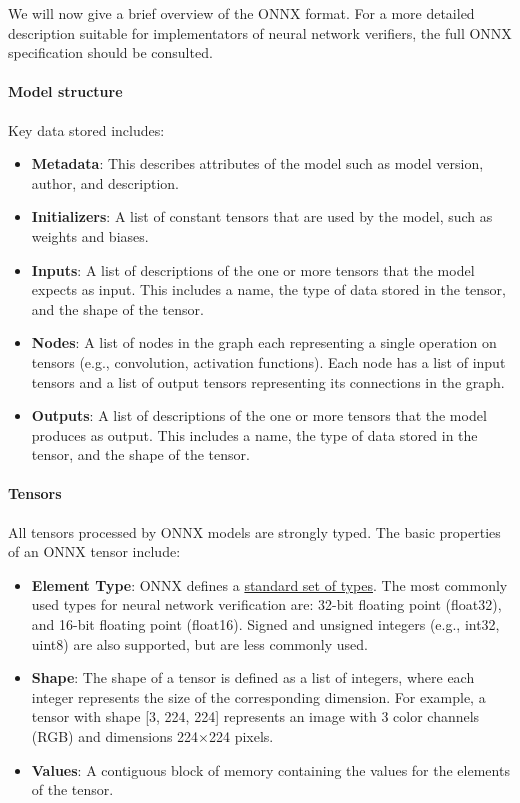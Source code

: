 We will now give a brief overview of the ONNX format. For a more detailed description suitable for implementators of neural network verifiers, the full ONNX specification should be consulted. 

\paragraph{Model structure} 

Key data stored includes:
\begin{itemize}
	\item \textbf{Metadata}: This describes attributes of the model such as model version, author, and description.
	\item \textbf{Initializers}: A list of constant tensors that are used by the model, such as weights and biases.
	\item \textbf{Inputs}: A list of descriptions of the one or more tensors that the model expects as input. This includes a name, the type of data stored in the tensor, and the shape of the tensor.
	\item \textbf{Nodes}: A list of nodes in the graph each representing a single operation on  tensors (e.g., convolution, activation functions). Each node has a list of input tensors and a list of output tensors representing its connections in the graph.
	\item \textbf{Outputs}: A list of descriptions of the one or more tensors that the model produces as output. This includes a name, the type of data stored in the tensor, and the shape of the tensor.
\end{itemize}


\paragraph{Tensors}
All tensors processed by ONNX models are strongly typed. The basic properties of an ONNX tensor include:
\begin{itemize}
	\item \textbf{Element Type}: ONNX defines a \href{https://onnx.ai/onnx/repo-docs/IR.html#tensor-element-types}{standard set of types}. 
	The most commonly used types for neural network verification are: 32-bit floating point (float32), and 16-bit floating point (float16). Signed and unsigned integers (e.g., int32, uint8) are also supported, but are less commonly used.
	\item \textbf{Shape}: The shape of a tensor is defined as a list of integers, where each integer represents the size of the corresponding dimension. For example, a tensor with shape [3, 224, 224] 
	represents an image with 3 color channels (RGB) and dimensions 224\(\times\)224 pixels.
	\item \textbf{Values}: A contiguous block of memory containing the values for the elements of the tensor.
\end{itemize}

